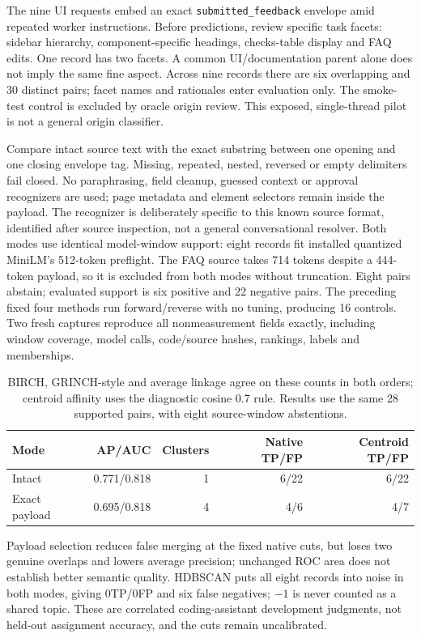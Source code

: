 \documentclass[11pt]{article}
\begin{document}
The nine UI requests embed an exact \texttt{submitted\_feedback} envelope amid
repeated worker instructions. Before predictions, review specific task facets:
sidebar hierarchy, component-specific headings, checks-table display and FAQ
edits. One record has two facets. A common UI/documentation parent alone does
not imply the same fine aspect. Across nine records there are six overlapping
and 30 distinct pairs; facet names and rationales enter evaluation only.
The smoke-test control is excluded by oracle origin review. This exposed,
single-thread pilot is not a general origin classifier.

Compare intact source text with the exact substring between one opening and
one closing envelope tag. Missing, repeated, nested, reversed or empty delimiters
fail closed. No paraphrasing, field cleanup, guessed context or approval
recognizers are used; page metadata and element selectors remain inside the
payload. The recognizer is deliberately specific to this known source format,
identified after source inspection, not a general conversational resolver.
Both modes use identical model-window support: eight records fit installed
quantized MiniLM's 512-token preflight. The FAQ source takes 714 tokens despite
a 444-token payload, so it is excluded from both modes without truncation.
Eight pairs abstain; evaluated support is six positive and 22 negative pairs.
The preceding fixed four methods run forward/reverse with no tuning, producing
16 controls. Two fresh captures reproduce all nonmeasurement fields exactly,
including window coverage, model calls, code/source hashes, rankings, labels
and memberships.

\begin{table}[ht]
\centering
\begin{tabular}{lrrrr}
\toprule
Mode &AP/AUC&Clusters&Native TP/FP&Centroid TP/FP\\
\midrule
Intact &0.771/0.818&1&6/22&6/22\\
Exact payload &0.695/0.818&4&4/6&4/7\\
\bottomrule
\end{tabular}
\caption{BIRCH, GRINCH-style and average linkage agree on these counts in both
orders; centroid affinity uses the diagnostic cosine 0.7 rule. Results use the
same 28 supported pairs, with eight source-window abstentions.}
\end{table}

Payload selection reduces false merging at the fixed native cuts, but loses two
genuine overlaps and lowers average precision; unchanged ROC area does not
establish better semantic quality. HDBSCAN puts all eight records into noise
in both modes, giving 0TP/0FP and six false negatives; $-1$ is never counted
as a shared topic. These are correlated coding-assistant development judgments,
not held-out assignment accuracy, and the cuts remain uncalibrated.
\end{document}
